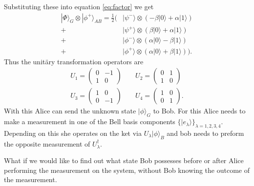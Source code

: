 \documentclass[a4paper]{article}
\begin{document}
Substituting these into equation \ref{eq:factor} we get
\begin{align}
    |\Phi\rangle_G \otimes |\phi^+\rangle_{AB} = \frac{1}{2} \big(&
     |\psi^-\rangle \otimes ( -\beta|0\rangle + \alpha |1\rangle)\\
    +&|\psi^+\rangle \otimes ( \beta|0\rangle +  \alpha|1\rangle)\\
    +&|\phi^-\rangle \otimes ( \alpha|0\rangle -\beta |1\rangle)\\
    +&|\phi^+\rangle \otimes ( \alpha|0\rangle +  \beta|1\rangle)
        \big).
\end{align}
Thus the unitäry transformation operators are
\begin{align}
    U_{1} =
    \begin{pmatrix}
        0 & -1\\
        1 & 0
    \end{pmatrix} \;\;\;\;\;\;\;
    U_{2} =
    \begin{pmatrix}
        0 & 1\\
        1 & 0
    \end{pmatrix}\\
    U_{3} =
    \begin{pmatrix}
        1 & 0\\
        0 & -1
    \end{pmatrix} \;\;\;\;\;\;\;
    U_{4} =
    \begin{pmatrix}
        1 & 0\\
        0 & 1
    \end{pmatrix}.
\end{align}
With this Alice can send the unknown state $|\phi\rangle_G$ to Bob. For this
Alice needs to make a measurement in one of the Bell basis components
$\{|e_\lambda\rangle\}_{\lambda=1,2,3,4}$. Depending on this she operates on
the ket via $U_\lambda |\phi\rangle_B$ and bob needs to preform the opposite
measurement of $U_\lambda^\dagger$.

What if we would like to find out what state Bob possesses before or after Alice
performing the measurement on the system, without Bob knowing the outcome of
the measurement.
\end{document}
